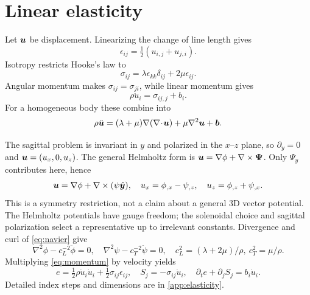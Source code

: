\chapter{Linear elasticity}\label{ch:elasticity}
Let $\bm{u}$ be displacement. Linearizing the change of line length gives
\begin{equation}\epsilon_{ij}=\tfrac12(u_{i,j}+u_{j,i}).\label{eq:strain}\end{equation}
Isotropy restricts Hooke's law to
\begin{equation}\sigma_{ij}=\lambda\epsilon_{kk}\delta_{ij}+2\mu\epsilon_{ij}.
\label{eq:hooke}\end{equation}
Angular momentum makes $\sigma_{ij}=\sigma_{ji}$, while linear momentum gives
\begin{equation}\rho\ddot u_i=\sigma_{ij,j}+b_i.\label{eq:momentum}\end{equation}
For a homogeneous body these combine into
\begin{equation}
 \rho\ddot{\bm{u}}=(\lambda+\mu)\nabla(\nabla\!\cdot\!\bm{u})
 +\mu\nabla^2\bm{u}+\bm{b}.\label{eq:navier}
\end{equation}

The sagittal problem is invariant in $y$ and polarized in the $x$--$z$ plane,
so $\partial_y=0$ and $\bm{u}=(u_x,0,u_z)$. The general Helmholtz form is
$\bm{u}=\nabla\phi+\nabla\times\bm{\Psi}$. Only $\Psi_y$ contributes here, hence
\begin{equation}
 \bm{u}=\nabla\phi+\nabla\times(\psi\hat{\bm{y}}),\quad
 u_x=\phi_{,x}-\psi_{,z},\quad u_z=\phi_{,z}+\psi_{,x}.\label{eq:potentials}
\end{equation}
This is a symmetry restriction, not a claim about a general 3D vector potential.
The Helmholtz potentials have gauge freedom; the solenoidal choice and sagittal
polarization select a representative up to irrelevant constants. Divergence and
curl of \cref{eq:navier} give
\begin{equation}
 \nabla^2\phi-c_L^{-2}\ddot\phi=0,\quad
 \nabla^2\psi-c_T^{-2}\ddot\psi=0,
 \quad c_L^2=(\lambda+2\mu)/\rho,\ c_T^2=\mu/\rho.\label{eq:potential-waves}
\end{equation}
Multiplying \cref{eq:momentum} by velocity yields
\begin{equation}
 e=\tfrac12\rho\dot u_i\dot u_i+\tfrac12\sigma_{ij}\epsilon_{ij},\quad
 S_j=-\sigma_{ij}\dot u_i,\quad \partial_t e+\partial_jS_j=b_i\dot u_i.
 \label{eq:energy-balance}
\end{equation}
Detailed index steps and dimensions are in \cref{app:elasticity}.
